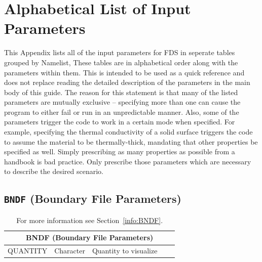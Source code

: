 \documentclass[11pt]{book}
\begin{document}
\chapter{Alphabetical List of Input Parameters}%

This Appendix lists all of the input parameters for FDS in seperate tables grouped by Namelist,
These tables are in alphabetical order along with the parameters within them.
This is intended to be used as a quick reference and does not replace reading
the detailed description of the parameters in the main body of this guide.
The reason for this statement is that many of the listed parameters are mutually exclusive -- specifying more than
one can cause the program to either fail or run in an unpredictable manner. Also, some of the parameters trigger the
code to work in a certain mode when specified. For example, specifying the thermal conductivity of
a solid surface triggers the code to assume the material to be thermally-thick, mandating that other
properties be specified as well. Simply prescribing as many properties as possible from a handbook is bad practice.
Only prescribe those parameters which are necessary to describe the desired scenario.


\clearpage

\section{\texorpdfstring{{\tt BNDF}}{BNDF} (Boundary File Parameters)}

\hspace{1in}

\begin{table}[H]
\caption{For more information see Section~\ref{info:BNDF}.}\label{tbl:BNDF}
\noindent
\begin{tabular*}{6.5in}{@{\extracolsep\fill}|l|l|l|l|l|}
\hline
\multicolumn{5}{|c|}{{\ct BNDF} (Boundary File Parameters)} \\ \hline \hline
{\ct QUANTITY}     & Character   & Quantity to visualize &           &     \\ \hline
\end{tabular*}
\end{table}
\end{document}
